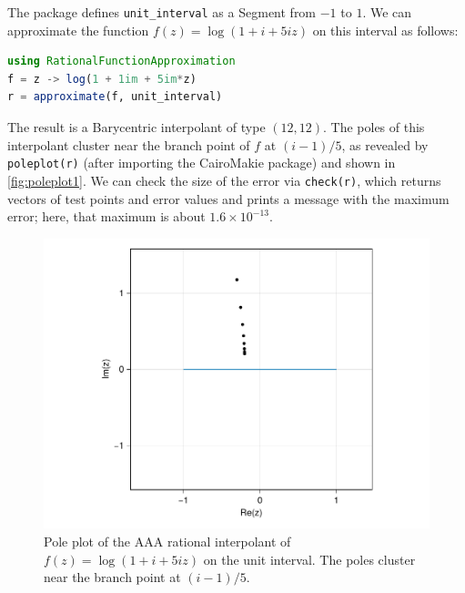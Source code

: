 \documentclass{juliacon}
\begin{document}
The package defines \verb|unit_interval| as a \textsf{Segment} from $-1$ to $1$. We can approximate the function $f(z) = \log(1 + i + 5iz)$ on this interval as follows:
\begin{lstlisting}[language = Julia, caption={Continuum AAA on the unit interval.}, label={lst:log}]
using RationalFunctionApproximation
f = z -> log(1 + 1im + 5im*z)
r = approximate(f, unit_interval)
\end{lstlisting}
The result is a \textsf{Barycentric} interpolant of type $(12,12)$. The poles of this interpolant cluster near the branch point of $f$ at $(i-1)/5$, as revealed by \verb|poleplot(r)| (after importing the \textsf{CairoMakie} package) and shown in \autoref{fig:poleplot1}. We can check the size of the error via \verb|check(r)|, which returns vectors of test points and error values and prints a message with the maximum error; here, that maximum is about $1.6\times 10^{-13}$. 

\begin{figure}
\centering
\includegraphics[width=\columnwidth]{poleplot1.pdf}
\caption{Pole plot of the AAA rational interpolant of $f(z) = \log(1 + i + 5iz)$ on the unit interval. The poles cluster near the branch point at $(i-1)/5$.}
\label{fig:poleplot1}
\end{figure}
\end{document}
